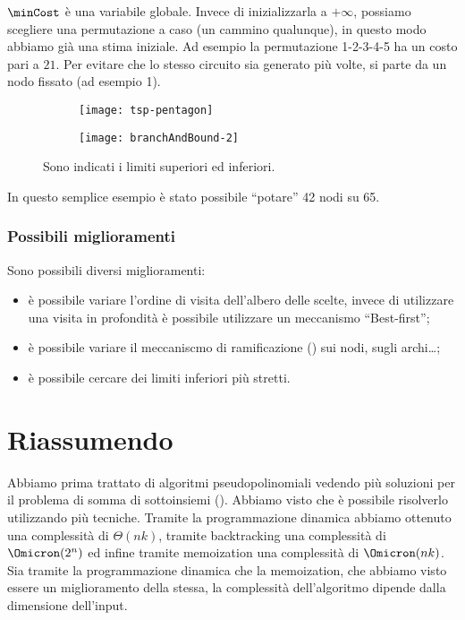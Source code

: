 \(\minCost\) è una variabile globale.
Invece di inizializzarla a \(+\infty\), possiamo scegliere una permutazione a caso (un cammino qualunque), in questo modo abbiamo già una stima iniziale.
Ad esempio la permutazione 1-2-3-4-5 ha un costo pari a \(21\).
Per evitare che lo stesso circuito sia generato più volte, si parte da un nodo fissato (ad esempio 1).

\begin{figure}[H]
	\begin{subfigure}{.25\linewidth}\centering
		\texttt{[image: tsp-pentagon]}
	\end{subfigure}%
	\begin{subfigure}{.75\linewidth}\centering
		\texttt{[image: branchAndBound-2]}
	\end{subfigure}
	\caption[Calcolo del limite inferiore e superiore]{Sono indicati i limiti superiori ed inferiori. }
\end{figure}
In questo semplice esempio è stato possibile \enquote{potare} 42 nodi su 65.

\subsubsection{Possibili miglioramenti}

Sono possibili diversi miglioramenti:
\begin{itemize}
	\item è possibile variare l'ordine di visita dell'albero delle scelte, invece di utilizzare una visita in profondità è possibile utilizzare un meccanismo \enquote{Best-first};
	\item è possibile variare il meccaniscmo di ramificazione () sui nodi, sugli archi\dots;
	\item è possibile cercare dei limiti inferiori più stretti.
\end{itemize}

\section{Riassumendo}

Abbiamo prima trattato di algoritmi pseudopolinomiali vedendo più soluzioni per il problema di somma di sottoinsiemi ({\subSetSumProblem}).
Abbiamo visto che è possibile risolverlo utilizzando più tecniche.
Tramite la programmazione dinamica abbiamo ottenuto una complessità di \(\Theta(nk)\), tramite backtracking una complessità di \(\Omicron(2^n)\) ed infine tramite memoization una complessità di \(\Omicron(nk)\).
Sia tramite la programmazione dinamica che la memoization, che abbiamo visto essere un miglioramento della stessa, la complessità dell'algoritmo dipende dalla dimensione dell'input.

